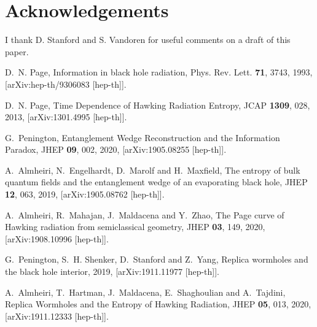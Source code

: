 \documentclass[11pt]{article}
\numberwithin{equation}{section}
\begin{document}
\section*{Acknowledgements}
I thank D. Stanford and S. Vandoren for useful comments on a draft of this paper.

\providecommand{\href}[2]{#2}\begingroup\raggedright\begin{thebibliography}{10}

D.~N. Page, {{Information in black hole radiation}},
  \href{http://dx.doi.org/10.1103/PhysRevLett.71.3743}{Phys. Rev. Lett. {\bf
  71}, 3743, 1993},
  [\href{http://arxiv.org/abs/arXiv:hep-th/9306083}{{arXiv:hep-th/9306083
  [hep-th]}}].

D.~N. Page, {{Time Dependence of Hawking Radiation Entropy}},
  \href{http://dx.doi.org/10.1088/1475-7516/2013/09/028}{JCAP {\bf 1309}, 028,
  2013}, [\href{http://arxiv.org/abs/arXiv:1301.4995}{{arXiv:1301.4995
  [hep-th]}}].

G.~Penington, {{Entanglement Wedge Reconstruction and the Information
  Paradox}}, \href{http://dx.doi.org/10.1007/JHEP09(2020)002}{JHEP {\bf 09},
  002, 2020}, [\href{http://arxiv.org/abs/arXiv:1905.08255}{{arXiv:1905.08255
  [hep-th]}}].

A.~Almheiri, N.~Engelhardt, D.~Marolf and H.~Maxfield, {{The entropy of bulk
  quantum fields and the entanglement wedge of an evaporating black hole}},
  \href{http://dx.doi.org/10.1007/JHEP12(2019)063}{JHEP {\bf 12}, 063, 2019},
  [\href{http://arxiv.org/abs/arXiv:1905.08762}{{arXiv:1905.08762 [hep-th]}}].

A.~Almheiri, R.~Mahajan, J.~Maldacena and Y.~Zhao, {{The Page curve of Hawking
  radiation from semiclassical geometry}},
  \href{http://dx.doi.org/10.1007/JHEP03(2020)149}{JHEP {\bf 03}, 149, 2020},
  [\href{http://arxiv.org/abs/arXiv:1908.10996}{{arXiv:1908.10996 [hep-th]}}].

G.~Penington, S.~H. Shenker, D.~Stanford and Z.~Yang, {{Replica wormholes and
  the black hole interior}},  2019,
  [\href{http://arxiv.org/abs/arXiv:1911.11977}{{arXiv:1911.11977 [hep-th]}}].

A.~Almheiri, T.~Hartman, J.~Maldacena, E.~Shaghoulian and A.~Tajdini, {{Replica
  Wormholes and the Entropy of Hawking Radiation}},
  \href{http://dx.doi.org/10.1007/JHEP05(2020)013}{JHEP {\bf 05}, 013, 2020},
  [\href{http://arxiv.org/abs/arXiv:1911.12333}{{arXiv:1911.12333 [hep-th]}}].


\end{thebibliography}
\end{document}
